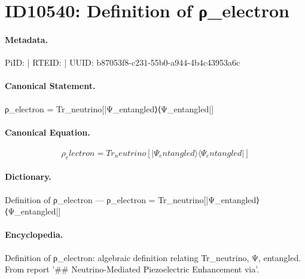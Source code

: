 \section*{ID10540: Definition of ρ\_electron}
\paragraph{Metadata.}
PiID:  | RTEID:  | UUID: b87053f8-c231-55b0-a944-4b4c43953a6c

\paragraph{Canonical Statement.}
ρ\_electron = Tr\_neutrino[|Ψ\_entangled⟩⟨Ψ\_entangled|]

\paragraph{Canonical Equation.}
\[
ρ_electron = Tr_neutrino[|Ψ_entangled⟩⟨Ψ_entangled|]
\]

\paragraph{Dictionary.}
Definition of ρ\_electron — ρ\_electron = Tr\_neutrino[|Ψ\_entangled⟩⟨Ψ\_entangled|]

\paragraph{Encyclopedia.}
Definition of ρ\_electron: algebraic definition relating Tr\_neutrino, Ψ, entangled. From report '\#\# Neutrino-Mediated Piezoelectric Enhancement via'.
